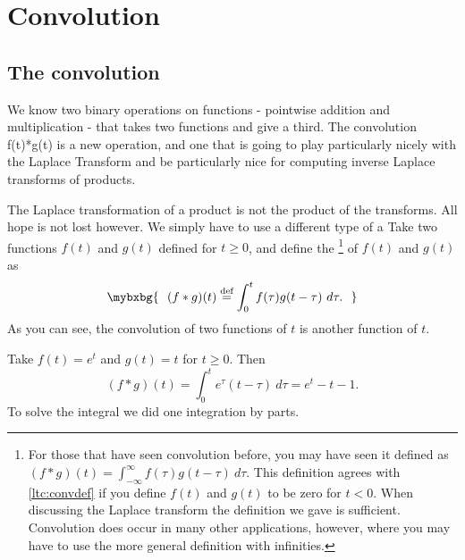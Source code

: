 
\sectionnewpage
\section{Convolution}
\label{convolution:section}





\subsection{The convolution}

\begin{video}[_LX_58L8SJg][Convolutions][la-convolutions]
	We know two binary operations on functions - pointwise addition and multiplication - that takes two functions and give a third. The convolution f(t)*g(t) is a new operation, and one that is going to play particularly nicely with the Laplace Transform and be particularly nice for computing inverse Laplace transforms of products. 
\end{video}

The Laplace transformation of a product is not the product
of the transforms.  All hope is not lost however.  We simply have to use
a different type of a 
Take
two functions $f(t)$ and $g(t)$ defined for $t \geq 0$,
and define the \emph{}%
\footnote{%
For those that have seen convolution before, you may have
seen it defined as
$(f * g)(t) =
\int_{-\infty}^\infty f(\tau) g(t-\tau) ~ d\tau$.  This definition
agrees with \eqref{ltc:convdef} if you define $f(t)$ and $g(t)$
to be zero for $t < 0$.
When discussing the Laplace transform the definition we gave is
sufficient.  Convolution does occur in many other applications, however,
where you may have to use the more general definition with infinities.
}
of $f(t)$ and $g(t)$ as
\begin{equation} \label{ltc:convdef}
\mybxbg{~~
(f * g)(t) \overset{\text{def}}{=}
\int_0^t f(\tau) g(t-\tau) ~ d\tau .
~~}
\end{equation}
As you can see, the convolution of two functions of $t$ is another function of $t$.


\begin{example}
Take $f(t) = e^t$ and $g(t) = t$ for $t \geq 0$.  Then 
\begin{equation*}
(f*g)(t)
=
\int_0^t e^\tau (t-\tau) ~ d\tau
=
e^t - t - 1 .
\end{equation*}
To solve the integral we
did one integration by parts.
\end{example}

